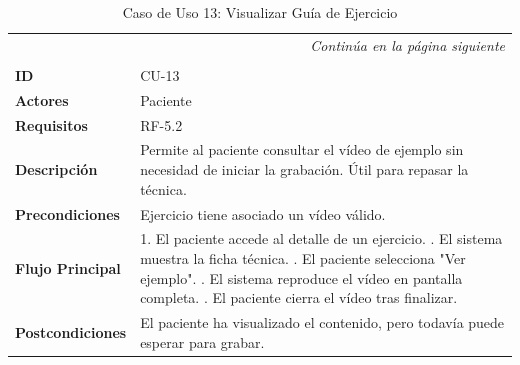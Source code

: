\clearpage
\begin{longtable}{p{} p{}}
    \toprule
    \endfirsthead
    \toprule
    \endhead
    \midrule
    \multicolumn{2}{r}{\small\itshape Continúa en la página siguiente} \\
    \endfoot
    \bottomrule
    \noalign{\vspace{0.5cm}}
    \caption{Caso de Uso 13: Visualizar Guía de Ejercicio} \label{cu:13} \\
    \endlastfoot

    \textbf{ID} & CU-13 \\ \midrule
    \textbf{Actores} & Paciente \\ \midrule
    \textbf{Requisitos} & RF-5.2 \\ \midrule
    \textbf{Descripción} & Permite al paciente consultar el vídeo de ejemplo sin necesidad de iniciar la grabación. Útil para repasar la técnica. \\ \midrule
    \textbf{Precondiciones} & Ejercicio tiene asociado un vídeo válido. \\ \midrule
    \textbf{Flujo Principal} & 
    1. El paciente accede al detalle de un ejercicio. \newline
    2. El sistema muestra la ficha técnica. \newline
    3. El paciente selecciona "Ver ejemplo". \newline
    4. El sistema reproduce el vídeo en pantalla completa. \newline
    5. El paciente cierra el vídeo tras finalizar. \\ \midrule
    \textbf{Postcondiciones} & El paciente ha visualizado el contenido, pero todavía puede esperar para grabar. \\
\end{longtable}


